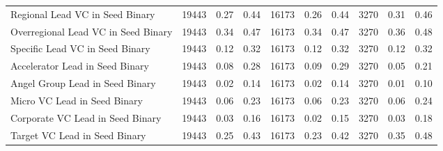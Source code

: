 \begin{table}[!h]
{\begin{tabular}[t]{lrrrrrrrrr}
Regional Lead VC in Seed Binary & 19443 & 0.27 & 0.44 & 16173 & 0.26 & 0.44 & 3270 & 0.31 & 0.46\\
Overregional Lead VC in Seed Binary & 19443 & 0.34 & 0.47 & 16173 & 0.34 & 0.47 & 3270 & 0.36 & 0.48\\
Specific Lead VC in Seed Binary & 19443 & 0.12 & 0.32 & 16173 & 0.12 & 0.32 & 3270 & 0.12 & 0.32\\
Accelerator Lead in Seed Binary & 19443 & 0.08 & 0.28 & 16173 & 0.09 & 0.29 & 3270 & 0.05 & 0.21\\
\addlinespace
Angel Group Lead in Seed Binary & 19443 & 0.02 & 0.14 & 16173 & 0.02 & 0.14 & 3270 & 0.01 & 0.10\\
Micro VC Lead in Seed Binary & 19443 & 0.06 & 0.23 & 16173 & 0.06 & 0.23 & 3270 & 0.06 & 0.24\\
Corporate VC Lead in Seed Binary & 19443 & 0.03 & 0.16 & 16173 & 0.02 & 0.15 & 3270 & 0.03 & 0.18\\
Target VC Lead in Seed Binary & 19443 & 0.25 & 0.43 & 16173 & 0.23 & 0.42 & 3270 & 0.35 & 0.48\\
\bottomrule
\end{tabular}}
\end{table}
